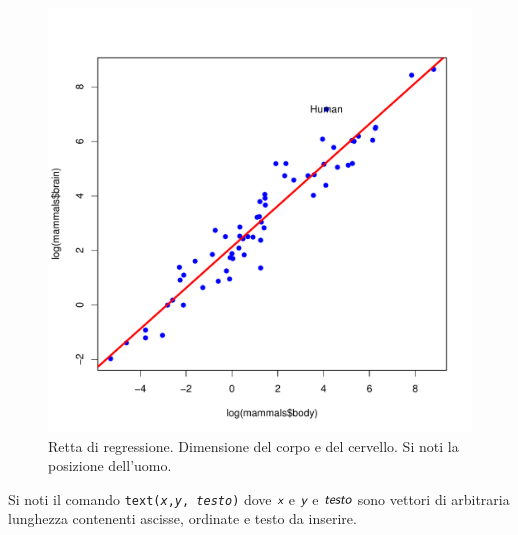 \documentclass[onecolumn,12pt]{book}\usepackage[]{graphicx}\usepackage[]{color}
\makeatletter
\def\maxwidth{ %
  \ifdim\Gin@nat@width>\linewidth
    \linewidth
  \else
    \Gin@nat@width
  \fi
}
\newenvironment{knitrout}{}{} %
\newcommand{\varia}[1]{\textsl{\textsf{#1}}}
\makeatother
\begin{document}
\begin{figure}[htbp]
\begin{center}
\begin{knitrout}
\color{fgcolor}
\includegraphics[width=\maxwidth]{figure/unnamed-chunk-129-1} 

\end{knitrout}
\caption{ Retta di regressione. Dimensione del corpo e del cervello. Si noti la posizione dell'uomo.}
\label{duerette}
\end{center}
\end{figure}
Si noti il comando \texttt{text(\varia{x},\varia{y}, \varia{testo})}
dove    $\varia{x}$ e $\varia{y}$  e $\varia{testo}$ sono vettori di arbitraria lunghezza contenenti ascisse, ordinate e testo da inserire.
\end{document}
